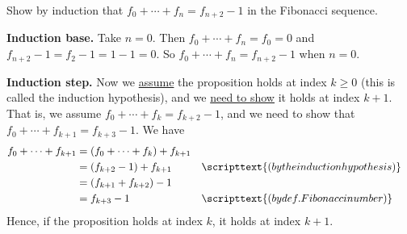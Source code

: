 \documentclass[10pt]{beamer}
\begin{document}
\begin{frame}

\begin{mygreenbox}[title=Exercise 3]
Show by induction that $f_0 + \cdots + f_n = f_{n+2} -1$ in the Fibonacci sequence.	
\end{mygreenbox}

\vfill \vfill 
\begin{myyellowbox}[title=Solution]
\textbf{Induction base.} Take $n=0$.  Then $f_0 + \cdots + f_n = f_0 =0$ and $f_{n+2} -1 = f_2 -1 = 1-1 = 0$. So $f_0 + \cdots + f_n = f_{n+2} -1$ when $n=0$.

\vspace{0.25cm}

\textbf{Induction step.} Now we \underline{assume} the proposition holds at index $k \geq 0$ (this is called the \alert{induction hypothesis}), and we \underline{need to show} it holds at index $k+1$.  That is, we assume $f_0 + \cdots + f_k = f_{k+2} -1$, and we need to show that $f_0 + \cdots + f_{k+1} = f_{k+3} -1$.  We have
%
\begin{align*}
f_0 + \cdots + f_{k+1} &= (f_0 + \cdots + f_k) + f_{k+1} \\
&=(f_{k+2} -1) + f_{k+1} && \scripttext{(by the induction hypothesis)} \\
&= (f_{k+1}+f_{k+2}) -1  && \\
&= f_{k+3} -1  && \scripttext{(by def. Fibonacci number)}	
\end{align*}
Hence, if the proposition holds at index $k$, it holds at index $k+1$.
\end{myyellowbox}
	
\end{frame}
\end{document}
